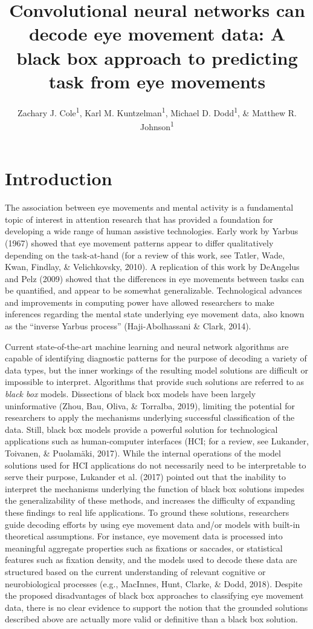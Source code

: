 \documentclass[
  english,
  man, donotrepeattitle,floatsintext]{apa6}
\title{Convolutional neural networks can decode eye movement data: A black box approach to predicting task from eye movements}
\author{Zachary J. Cole\textsuperscript{1}, Karl M. Kuntzelman\textsuperscript{1}, Michael D. Dodd\textsuperscript{1}, \& Matthew R. Johnson\textsuperscript{1}}
\date{}
\affiliation{\vspace{0.5cm}\textsuperscript{1} University of Nebraska-Lincoln}
\begin{document}
\maketitle

\section{Introduction}

The association between eye movements and mental activity is a fundamental topic of interest in attention research that has provided a foundation for developing a wide range of human assistive technologies. Early work by Yarbus (1967) showed that eye movement patterns appear to differ qualitatively depending on the task-at-hand (for a review of this work, see Tatler, Wade, Kwan, Findlay, \& Velichkovsky, 2010). A replication of this work by DeAngelus and Pelz (2009) showed that the differences in eye movements between tasks can be quantified, and appear to be somewhat generalizable. Technological advances and improvements in computing power have allowed researchers to make inferences regarding the mental state underlying eye movement data, also known as the \enquote{inverse Yarbus process} (Haji-Abolhassani \& Clark, 2014).

Current state-of-the-art machine learning and neural network algorithms are capable of identifying diagnostic patterns for the purpose of decoding a variety of data types, but the inner workings of the resulting model solutions are difficult or impossible to interpret. Algorithms that provide such solutions are referred to as \emph{black box} models. Dissections of black box models have been largely uninformative (Zhou, Bau, Oliva, \& Torralba, 2019), limiting the potential for researchers to apply the mechanisms underlying successful classification of the data. Still, black box models provide a powerful solution for technological applications such as human-computer interfaces (HCI; for a review, see Lukander, Toivanen, \& Puolamäki, 2017). While the internal operations of the model solutions used for HCI applications do not necessarily need to be interpretable to serve their purpose, Lukander et al. (2017) pointed out that the inability to interpret the mechanisms underlying the function of black box solutions impedes the generalizability of these methods, and increases the difficulty of expanding these findings to real life applications. To ground these solutions, researchers guide decoding efforts by using eye movement data and/or models with built-in theoretical assumptions. For instance, eye movement data is processed into meaningful aggregate properties such as fixations or saccades, or statistical features such as fixation density, and the models used to decode these data are structured based on the current understanding of relevant cognitive or neurobiological processes (e.g., MacInnes, Hunt, Clarke, \& Dodd, 2018). Despite the proposed disadvantages of black box approaches to classifying eye movement data, there is no clear evidence to support the notion that the grounded solutions described above are actually more valid or definitive than a black box solution.
\end{document}

